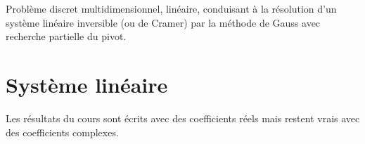 \documentclass[10pt]{article}
\begin{document}

\begin{minipage}[c]{.2\linewidth}
\begin{center}
\end{center}
\end{minipage}\hfill
\begin{minipage}[c]{.33\linewidth}
\begin{center}
\end{center}
\end{minipage}\hfill
\begin{minipage}[c]{.45\linewidth}
\begin{center}
\end{center}
\end{minipage}
\vspace{.5cm}

\begin{savoir}
Problème discret multidimensionnel, linéaire, conduisant à la résolution d’un système linéaire inversible (ou de Cramer) par la méthode de Gauss avec recherche partielle du pivot.

\end{savoir}



\setlength{\parskip}{0ex plus 0.2ex minus 0ex}
 \renewcommand{\contentsname}{}
 \renewcommand{\baselinestretch}{1}

\tableofcontents

 \renewcommand{\baselinestretch}{1.2}
\setlength{\parskip}{2ex plus 0.5ex minus 0.2ex}





\section{Système linéaire}
\begin{rem}
Les résultats du cours sont écrits avec des coefficients réels mais restent vrais avec des coefficients complexes. 
\end{rem}
\end{document}
